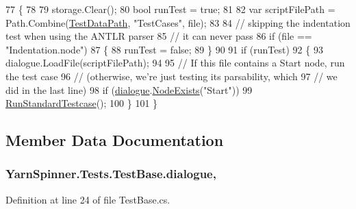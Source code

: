 \begin{DoxyCode}
77                                              \{
78 
79             storage.Clear();
80             \textcolor{keywordtype}{bool} runTest = \textcolor{keyword}{true};
81 
82             var scriptFilePath = Path.Combine(\hyperlink{a00154_aa9b4d902d61adad7165154a265f69aa4}{TestDataPath}, \textcolor{stringliteral}{"TestCases"}, file);
83 
84             \textcolor{comment}{// skipping the indentation test when using the ANTLR parser}
85             \textcolor{comment}{// it can never pass}
86             \textcolor{keywordflow}{if} (file == \textcolor{stringliteral}{"Indentation.node"})
87             \{
88                 runTest = \textcolor{keyword}{false};
89             \}
90 
91             \textcolor{keywordflow}{if} (runTest)
92             \{
93                 dialogue.LoadFile(scriptFilePath);
94 
95                 \textcolor{comment}{// If this file contains a Start node, run the test case}
96                 \textcolor{comment}{// (otherwise, we're just testing its parsability, which}
97                 \textcolor{comment}{// we did in the last line)}
98                 \textcolor{keywordflow}{if} (\hyperlink{a00154_a4cff5de56c4b8a91c76b6eb2d622a795}{dialogue}.\hyperlink{a00090_a93bb76a1f9a4058f225ff4cee97483c6}{NodeExists}(\textcolor{stringliteral}{"Start"}))
99                     \hyperlink{a00154_abffa134d40d72b21e6b35c3bf05fc53f}{RunStandardTestcase}();
100             \}
101         \}
\end{DoxyCode}


\subsection{Member Data Documentation}
\hypertarget{a00154_a4cff5de56c4b8a91c76b6eb2d622a795}{
\subsubsection[{dialogue}]{ Yarn\-Spinner.\-Tests.\-Test\-Base.\-dialogue\hspace{0.3cm}{\ttfamily [protected]}, {\ttfamily [inherited]}}}\label{a00154_a4cff5de56c4b8a91c76b6eb2d622a795}


Definition at line 24 of file Test\-Base.\-cs.

